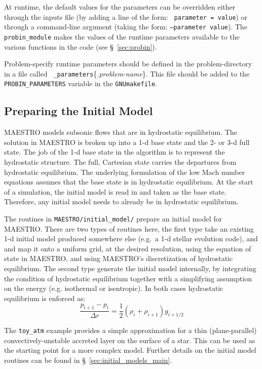 At runtime, the default values for the parameters can be overridden
either through the inputs file (by adding a line of the form: {\tt
  parameter = value}) or through a command-line argument (taking the
form: {\tt --parameter value}).  The {\tt probin\_module} makes the
values of the runtime parameters available to the various functions
in the code (see \S~\ref{sec:probin}).

Problem-specify runtime parameters should be defined in the
problem-directory in a file called {\tt
  \_parameters}\{{\em.problem-name}\}.  This file should be added
to the {\tt PROBIN\_PARAMETERS} variable in the {\tt GNUmakefile}.



\subsection{Preparing the Initial Model}

\label{sec:initial_models}

MAESTRO models subsonic flows that are in hydrostatic equilibrium.
The solution in MAESTRO is broken up into a 1-d base state and the 2-
or 3-d full state.  The job of the 1-d base state in the algorithm is
to represent the hydrostatic structure.  The full, Cartesian state
carries the departures from hydrostatic equilibrium.  The underlying
formulation of the low Mach number equations assumes that the base
state is in hydrostatic equilibrium.  At the start of a simulation,
the initial model is read in and taken as the base state.  Therefore,
any initial model needs to already be in hydrostatic equilibrium.

The routines in {\tt MAESTRO/initial\_model/} prepare an initial model
for MAESTRO.  There are two types of routines here, the first type
take an existing 1-d initial model produced somewhere else (e.g.\ a
1-d stellar evolution code), and and map it onto a uniform grid, at
the desired resolution, using the equation of state in MAESTRO, and
using MAESTRO's discretization of hydrostatic equilibrium.  The second
type generate the initial model internally, by integrating the
condition of hydrostatic equilibrium together with a simplifying
assumption on the energy (e.g. isothermal or isentropic).  In
both cases hydrostatic equilibrium is enforced as:
\begin{equation}
\frac{p_{i+1} - p_i}{\Delta r} = \frac{1}{2} (\rho_i + \rho_{i+1})
g_{i+1/2}
\end{equation}

The {\tt toy\_atm} example provides a simple approximation for a thin
(plane-parallel) convectively-unstable accreted layer on the surface
of a star.  This can be used as the starting point for a more complex
model.  Further details on the initial model routines can be 
found in \S~\ref{sec:initial_models_main}.



